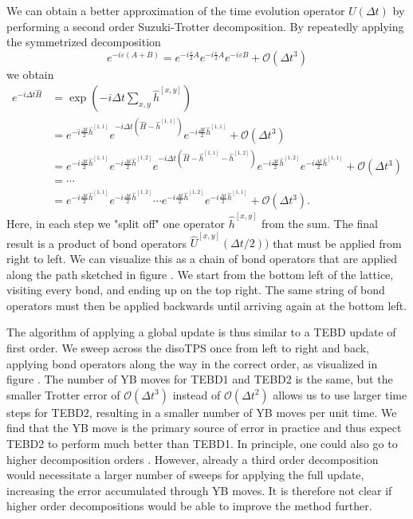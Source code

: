 We can obtain a better approximation of the time evolution operator $U(\Delta t)$ by performing a second order Suzuki-Trotter decomposition. By repeatedly applying the symmetrized decomposition
\begin{equation}
	e^{-i\varepsilon(A+B)} = e^{-i\frac{\varepsilon}{2}A}e^{-i\frac{\varepsilon}{2}A}e^{-i\varepsilon B} + \mathcal{O}(\Delta t^3)
\end{equation}
we obtain
\begin{equation}
	\begin{split}
		\label{eq:disoTPS_tebd_second_order_suzuki_trotter_decomposition}
		e^{-i\Delta t\hat{H}} &= \exp\left(-i\Delta t\sum_{x,y}\hat{h}^{[x,y]}\right) \\
		&= e^{-i\frac{\Delta t}{2}\hat{h}^{[1, 1]}} e^{-i\Delta t\left(\hat{H}-\hat{h}^{[1,1]}\right)} e^{-i\frac{\Delta t}{2}\hat{h}^{[1, 1]}} + \mathcal{O}(\Delta t^3)\\
		&= e^{-i\frac{\Delta t}{2}\hat{h}^{[1, 1]}} e^{-i\frac{\Delta t}{2}\hat{h}^{[1, 2]}} e^{-i\Delta t\left(\hat{H}-\hat{h}^{[1,1]}-\hat{h}^{[1, 2]}\right)} e^{-i\frac{\Delta t}{2}\hat{h}^{[1, 2]}} e^{-i\frac{\Delta t}{2}\hat{h}^{[1, 1]}} + \mathcal{O}(\Delta t^3)\\
		&=\cdots\\
		&= e^{-i\frac{\Delta t}{2}\hat{h}^{[1, 1]}} e^{-i\frac{\Delta t}{2}\hat{h}^{[1, 2]}} \cdots e^{-i\frac{\Delta t}{2}\hat{h}^{[1, 2]}} e^{-i\frac{\Delta t}{2}\hat{h}^{[1, 1]}} + \mathcal{O}(\Delta t^3).
	\end{split}
\end{equation}
Here, in each step we "split off" one operator $\hat{h}^{[x,y]}$ from the sum. The final result is a product of bond operators $\hat{U}^{[x,y]}(\Delta t/2))$ that must be applied from right to left. We can visualize this as a chain of bond operators that are applied along the path sketched in figure . We start from the bottom left of the lattice, visiting every bond, and ending up on the top right. The same string of bond operators must then be applied backwards until arriving again at the bottom left. \par
The algorithm of applying a global update is thus similar to a TEBD update of first order. We sweep across the disoTPS once from left to right and back, applying bond operators along the way in the correct order, as visualized in figure . The number of YB moves for TEBD1 and TEBD2 is the same, but the smaller Trotter error of $\mathcal{O}(\Delta t^3)$ instead of $\mathcal{O}(\Delta t^2)$ allows us to use larger time steps for TEBD2, resulting in a smaller number of YB moves per unit time. We find that the YB move is the primary source of error in practice and thus expect TEBD2 to perform much better than TEBD1. In principle, one could also go to higher decomposition orders \cite{cite:finding_exponential_product_formulas_of_higher_orders}. However, already a third order decomposition would necessitate a larger number of sweeps for applying the full update, increasing the error accumulated through YB moves. It is therefore not clear if higher order decompositions would be able to improve the method further.
